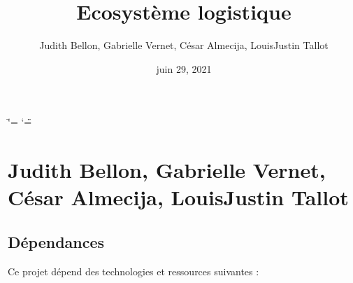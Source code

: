 \documentclass[letterpaper,10pt,french]{sphinxmanual}
\title{Ecosystème logistique}
\date{juin 29, 2021}
\author{Judith Bellon, Gabrielle Vernet, César Almecija, Louis\sphinxhyphen{}Justin Tallot}
\begin{document}
\ifdefined\shorthandoff
  \ifnum\catcode`\=\string=\active\shorthandoff{=}\fi
  \ifnum\catcode`\"=\active{}\fi
\fi

\pagestyle{empty}
\sphinxmaketitle
\pagestyle{plain}
\sphinxtableofcontents
\pagestyle{normal}
\label{\detokenize{index::doc}}



\chapter{Judith Bellon, Gabrielle Vernet, César Almecija, Louis\sphinxhyphen{}Justin Tallot}
\label{\detokenize{index:judith-bellon-gabrielle-vernet-cesar-almecija-louis-justin-tallot}}

\section{Dépendances}
\label{\detokenize{index:dependances}}
\sphinxAtStartPar
Ce projet dépend des technologies et ressources suivantes :
\end{document}
